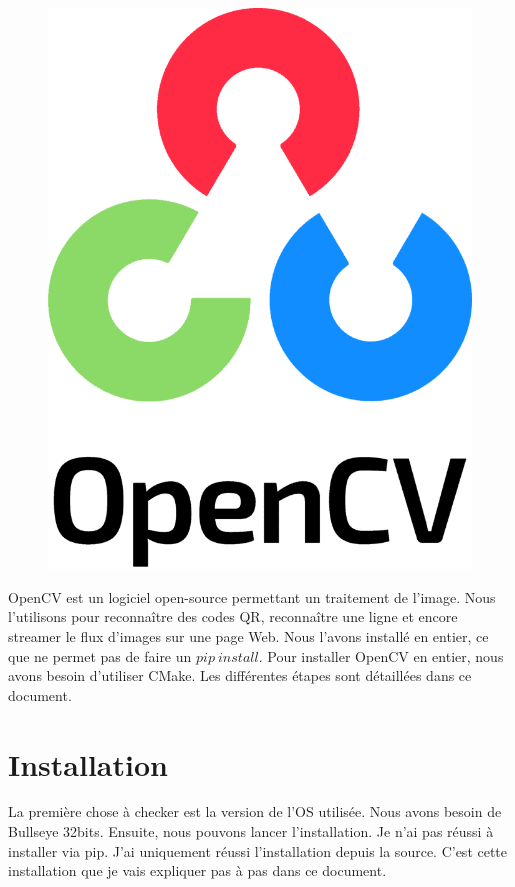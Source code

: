 \documentclass[
	a4paper,									%
	11pt,										%
	twoside,									%
	openright,									%
	notitlepage,									%
	parskip=half,								%
]{scrreprt}										%
\begin{document}
\begin{figure}[!ht]
	\centering
	\includegraphics[scale=.3]{img/OpenCV.png}
	\label{OpenCV}
\end{figure}

OpenCV est un logiciel open-source permettant un traitement de l'image. Nous l'utilisons pour reconnaître des codes QR,
reconnaître une ligne et encore streamer le flux d'images sur une page Web. Nous l'avons installé en entier, ce que 
ne permet pas de faire un $pip\ install$. Pour installer OpenCV en entier, nous avons besoin d'utiliser CMake. 
Les différentes étapes sont détaillées dans ce document.

\chapter{Installation}

La première chose à checker est la version de l'OS utilisée. Nous avons besoin de Bullseye 32bits. 
Ensuite, nous pouvons lancer l'installation. Je n'ai pas réussi à installer via pip. J'ai uniquement réussi 
l'installation depuis la source. C'est cette installation que je vais expliquer pas à pas dans ce document. \par
\end{document}
